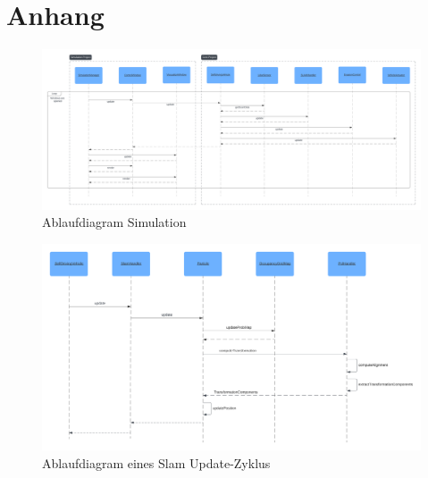 \section{Anhang}

\begin{figure}
    \centering
    \includegraphics[width=1\linewidth]{graphics/simulation_sequence_diagram.png}
    \caption{Ablaufdiagram Simulation}
    \label{fig:simulation_sequence_diagram}
\end{figure}

\begin{figure}
    \centering
    \includegraphics[width=1\linewidth]{graphics/slam_sequence_diagram.png}
    \caption{Ablaufdiagram eines Slam Update-Zyklus}
    \label{fig:slam_sequence_diagram}
\end{figure}

\newpage
